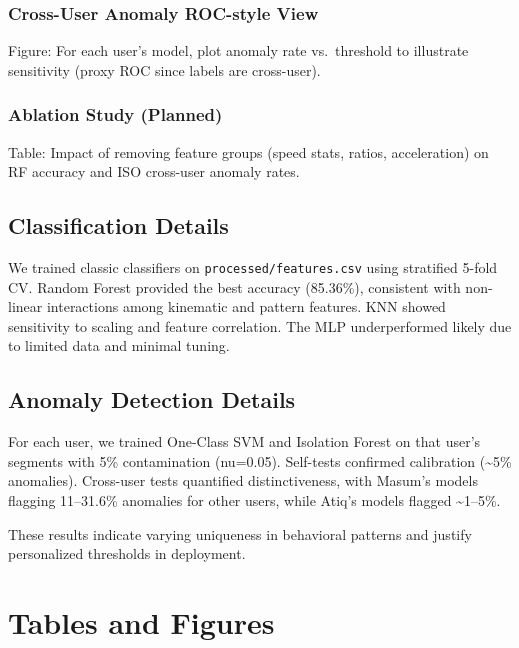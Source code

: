 \documentclass[
  12pt,
]{article}
\begin{document}
\subsubsection{Cross-User Anomaly ROC-style
View}\label{cross-user-anomaly-roc-style-view}

Figure: For each user's model, plot anomaly rate vs.~threshold to
illustrate sensitivity (proxy ROC since labels are cross-user).

\subsubsection{Ablation Study (Planned)}\label{ablation-study-planned}

Table: Impact of removing feature groups (speed stats, ratios,
acceleration) on RF accuracy and ISO cross-user anomaly rates.

\subsection{Classification Details}\label{classification-details}

We trained classic classifiers on \texttt{processed/features.csv} using
stratified 5-fold CV. Random Forest provided the best accuracy
(85.36\%), consistent with non-linear interactions among kinematic and
pattern features. KNN showed sensitivity to scaling and feature
correlation. The MLP underperformed likely due to limited data and
minimal tuning.

\subsection{Anomaly Detection Details}\label{anomaly-detection-details}

For each user, we trained One-Class SVM and Isolation Forest on that
user's segments with 5\% contamination (nu=0.05). Self-tests confirmed
calibration (\textasciitilde5\% anomalies). Cross-user tests quantified
distinctiveness, with Masum's models flagging 11--31.6\% anomalies for
other users, while Atiq's models flagged \textasciitilde1--5\%.

These results indicate varying uniqueness in behavioral patterns and
justify personalized thresholds in deployment.

\section{Tables and Figures}\label{tables-and-figures}
\end{document}

